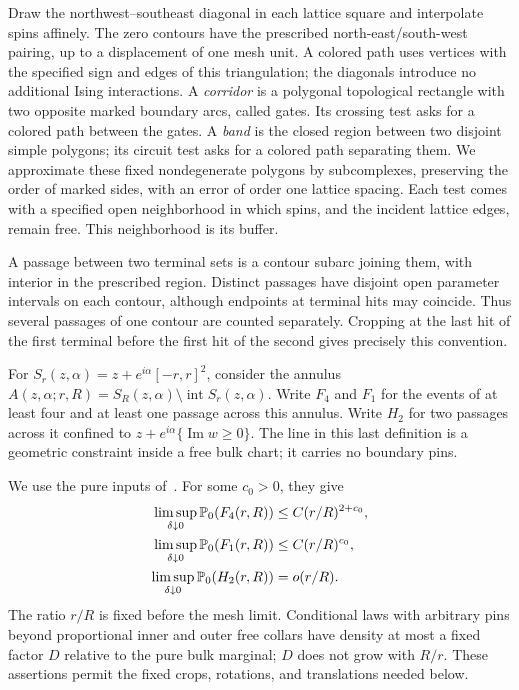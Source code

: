 Draw the northwest--southeast diagonal in each lattice square and
interpolate spins affinely.  The zero contours have the prescribed
north-east/south-west pairing, up to a displacement of one mesh unit.
A colored path uses vertices with the specified sign and edges of this
triangulation; the diagonals introduce no additional Ising interactions.
A \emph{corridor} is a polygonal topological rectangle with two opposite
marked boundary arcs, called gates.  Its crossing test asks for a colored
path between the gates.  A \emph{band} is the closed region between two
disjoint simple polygons; its circuit test asks for a colored path
separating them.  We approximate these fixed nondegenerate polygons by
subcomplexes, preserving the order of marked sides, with an error of
order one lattice spacing.  Each test comes with a specified open
neighborhood in which spins, and the incident lattice edges, remain free.
This neighborhood is its buffer.

A passage between two terminal sets is a contour subarc joining them,
with interior in the prescribed region.  Distinct passages have disjoint
open parameter intervals on each contour, although endpoints at terminal
hits may coincide.  Thus several passages of one contour are counted
separately.  Cropping at the last hit of the first terminal before the
first hit of the second gives precisely this convention.

For $S_r(z,\alpha)=z+e^{i\alpha}[-r,r]^2$, consider the annulus
$A(z,\alpha;r,R)=S_R(z,\alpha)\setminus\operatorname{int}S_r(z,\alpha)$.
Write $F_4$ and $F_1$ for the events of at least four and at least one
passage across this annulus.  Write $H_2$ for two passages across it
confined to $z+e^{i\alpha}\{\operatorname{Im}w\geq0\}$.  The line in
this last definition is a geometric constraint inside a free bulk
chart; it carries no boundary pins.

We use the pure inputs of~\cite[Section~2, ``Iterated four-passage
bound'', ``Pure buffered RSW consequences'', and ``Two collars around
an annulus''; Section~5, ``Two bulk passages confined to a half-plane'']{S}.
For some $c_0>0$, they give
\begin{equation}
 \begin{aligned}
 \limsup_{\delta\downarrow0}\mathbb P_0(F_4(r,R))&\leq C(r/R)^{2+c_0},\\
 \limsup_{\delta\downarrow0}\mathbb P_0(F_1(r,R))&\leq C(r/R)^{c_0},\\
 \limsup_{\delta\downarrow0}\mathbb P_0(H_2(r,R))&=o(r/R).
 \end{aligned}
 \label{eq:crossing-pure-inputs}
\end{equation}
The ratio $r/R$ is fixed before the mesh limit.  Conditional laws with
arbitrary pins beyond proportional inner and outer free collars have
density at most a fixed factor $D$ relative to the pure bulk marginal;
$D$ does not grow with $R/r$.  These assertions permit the fixed crops,
rotations, and translations needed below.

